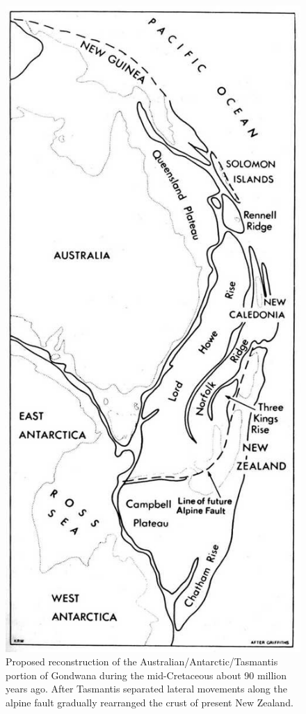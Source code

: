 \begin{figure}[htb]
\begin{minipage}[t]{0.372\textwidth}
    	\includegraphics[width=.9\textwidth]{graphics/figure3gondwana.jpg}
    	\caption[Proposed reconstruction of the Australian/Antarctic/Tasmantis portion of Gondwana]{Proposed reconstruction of the Australian/Antarctic/Tasmantis portion of Gondwana during the mid-Cretaceous about 90 million years ago.
    	After Tasmantis separated lateral movements along the alpine fault gradually rearranged the crust of present New Zealand.}%
    	\label{fig:3gondwana}
	\end{minipage}
\end{figure}

